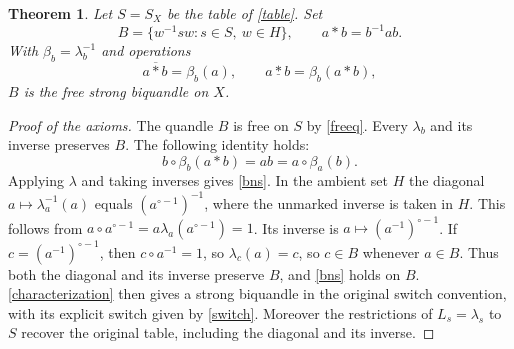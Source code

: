 \documentclass[11pt,a4paper]{article}
\newtheorem{theorem}{Theorem}
\begin{document}
\begin{theorem}\label{main}
Let $S=S_X$ be the table of \cref{table}. Set
\[
B=\{w^{-1}sw:s\in S,\ w\in H\},\qquad a*b=b^{-1}ab.
\]
With $\beta_b=\lambda_b^{-1}$ and operations
\[
a\mathbin{\overline{*}}b=\beta_b(a),\qquad
a\mathbin{\underline{*}}b=\beta_b(a*b),
\]
$B$ is the free strong biquandle on $X$.
\end{theorem}
\begin{proof}[Proof of the axioms]
The quandle $B$ is free on $S$ by \cref{freeq}. Every $\lambda_b$ and its inverse preserves $B$. The following identity holds:
\[
b\circ\beta_b(a*b)=ab=a\circ\beta_a(b).
\]
Applying $\lambda$ and taking inverses gives \eqref{bns}. In the ambient set $H$ the diagonal $a\mapsto\lambda_a^{-1}(a)$ equals $(a^{\circ-1})^{-1}$, where the unmarked inverse is taken in $H$. This follows from $a\circ a^{\circ-1}=a\lambda_a(a^{\circ-1})=1$. Its inverse is $a\mapsto(a^{-1})^{\circ-1}$. If $c=(a^{-1})^{\circ-1}$, then $c\circ a^{-1}=1$, so $\lambda_c(a)=c$, so $c\in B$ whenever $a\in B$. Thus both the diagonal and its inverse preserve $B$, and \eqref{bns} holds on $B$. \cref{characterization} then gives a strong biquandle in the original switch convention, with its explicit switch given by \eqref{switch}. Moreover the restrictions of $L_s=\lambda_s$ to $S$ recover the original table, including the diagonal and its inverse.
\end{proof}
\end{document}
